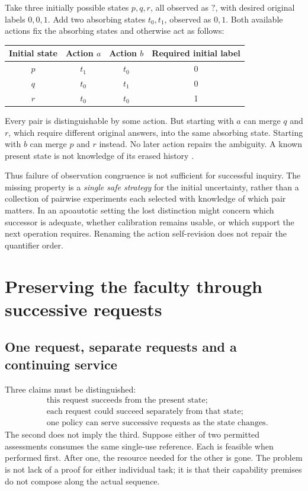 Take three initially possible states \(p,q,r\), all observed as \(?\), with desired original labels \(0,0,1\). Add two absorbing states \(t_0,t_1\), observed as \(0,1\). Both available actions fix the absorbing states and otherwise act as follows:
\begin{center}
\begin{tabular}{@{}cccc@{}}
\toprule
Initial state & Action \(a\) & Action \(b\) & Required initial label\\
\midrule
\(p\)&\(t_1\)&\(t_0\)&0\\
\(q\)&\(t_0\)&\(t_1\)&0\\
\(r\)&\(t_0\)&\(t_0\)&1\\
\bottomrule
\end{tabular}
\end{center}
Every pair is distinguishable by some action. But starting with \(a\) can merge \(q\) and \(r\), which require different original answers, into the same absorbing state. Starting with \(b\) can merge \(p\) and \(r\) instead. No later action repairs the ambiguity. A known present state is not knowledge of its erased history \cite[\S5.3]{ICS}.

Thus failure of observation congruence is not sufficient for successful inquiry. The missing property is a \emph{single safe strategy} for the initial uncertainty, rather than a collection of pairwise experiments each selected with knowledge of which pair matters. In an apoautotic setting the lost distinction might concern which successor is adequate, whether calibration remains usable, or which support the next operation requires. Renaming the action self-revision does not repair the quantifier order.

\section{Preserving the faculty through successive requests}
\label{sec:iteration}

\subsection{One request, separate requests and a continuing service}

Three claims must be distinguished:
\begin{equation}
\begin{split}
&\text{this request succeeds from the present state};\\
&\text{each request could succeed separately from that state};\\
&\text{one policy can serve successive requests as the state changes}.
\end{split}
\label{eq:threecap}
\end{equation}
The second does not imply the third. Suppose either of two permitted assessments consumes the same single-use reference. Each is feasible when performed first. After one, the resource needed for the other is gone. The problem is not lack of a proof for either individual task; it is that their capability premises do not compose along the actual sequence.

